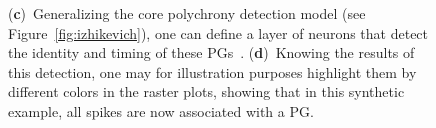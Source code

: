 \documentclass[brainsci, %
               review,accept,pdftex,moreauthors
               ]{Definitions/mdpi}
\begin{document}
\begin{figure}[H]
{      { (\textbf{c})}~Generalizing the core polychrony detection model (see Figure~\ref{fig:izhikevich}), one can define a layer of neurons that detect the identity and timing of these PGs~\citep{grimaldi_learning_2022}. %
      { (\textbf{d})}~Knowing the %
   results of this detection, one may for illustration purposes highlight them by different colors in the raster plots, showing that in this synthetic example, all spikes are now associated with a PG. 
       }
    \label{fig:THC} %
  \end{figure}
% 
\end{document}
